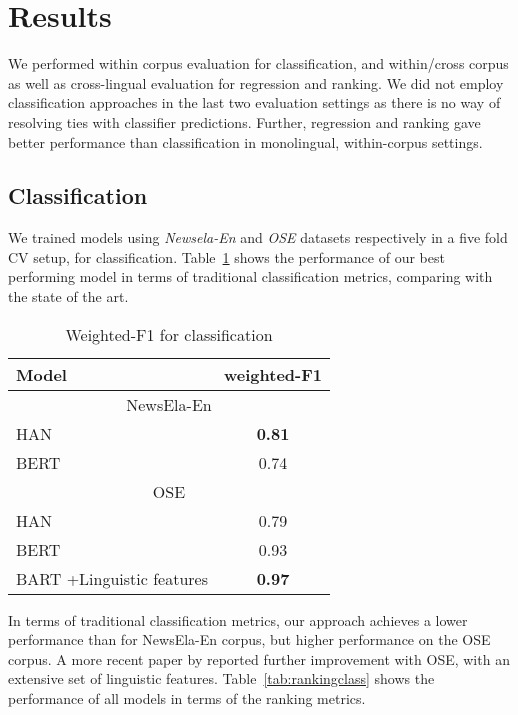 \documentclass[11pt]{article}
\begin{document}
\section{Results}
\label{sec:results} 
We performed within corpus evaluation for classification, and within/cross corpus as well as cross-lingual evaluation for regression and ranking. We did not employ classification approaches in the last two evaluation settings as there is no way of resolving ties with classifier predictions. Further, regression and ranking gave better performance than classification in monolingual, within-corpus settings.

\subsection{Classification}
We trained models using \textit{Newsela-En} and \textit{OSE} datasets respectively in a five fold CV setup, for classification. Table~\ref{tab:justclass} shows the performance of our best performing model in terms of traditional classification metrics, comparing with the state of the art. 

\begin{table}[htb]
\begin{tabular}{|p{4.95cm}|c|}
\hline
Model & weighted-F1\\ \hline
\multicolumn{2}{|c|}{NewsEla-En} \\ \hline
HAN \cite{Martinc.Pollak.ea-21} & \textbf{0.81}\\
BERT & 0.74 \\ \hline
\multicolumn{2}{|c|}{OSE} \\ \hline
HAN \cite{Martinc.Pollak.ea-21} &0.79 \\
BERT & 0.93\\ 
BART \cite{Lewis.Liu.ea-20}+Linguistic features \cite{Lee.Jang.ea-21} & \textbf{0.97} \\ \hline
\end{tabular}
\caption{Weighted-F1 for classification}
\label{tab:justclass}
\end{table}
In terms of traditional classification metrics, our approach achieves a lower performance than  for NewsEla-En corpus, but higher performance on the OSE corpus. A more recent paper by  reported further improvement with OSE, with an extensive set of linguistic features. Table~\ref{tab:rankingclass} shows the performance of all models in terms of the ranking metrics.
\end{document}
